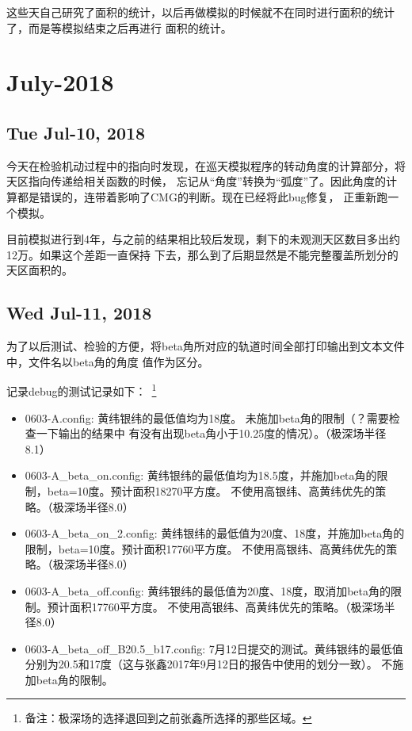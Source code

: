 这些天自己研究了面积的统计，以后再做模拟的时候就不在同时进行面积的统计了，而是等模拟结束之后再进行
面积的统计。

\section{July-2018}

\subsection{Tue Jul-10, 2018}
今天在检验机动过程中的指向时发现，在巡天模拟程序的转动角度的计算部分，将天区指向传递给相关函数的时候，
忘记从“角度”转换为“弧度”了。因此角度的计算都是错误的，连带着影响了CMG的判断。现在已经将此bug修复，
正重新跑一个模拟。

目前模拟进行到4年，与之前的结果相比较后发现，剩下的未观测天区数目多出约12万。如果这个差距一直保持
下去，那么到了后期显然是不能完整覆盖所划分的天区面积的。

\subsection{Wed Jul-11, 2018}

为了以后测试、检验的方便，将beta角所对应的轨道时间全部打印输出到文本文件中，文件名以beta角的角度
值作为区分。

记录debug的测试记录如下：~\footnote{备注：极深场的选择退回到之前张鑫所选择的那些区域。}
\begin{itemize}
\item 0603-A.config: 黄纬银纬的最低值均为18度。  未施加beta角的限制（？需要检查一下输出的结果中
有没有出现beta角小于10.25度的情况）。（极深场半径8.1）

\item 0603-A\_beta\_on.config:
黄纬银纬的最低值均为18.5度，并施加beta角的限制，beta=10度。预计面积18270平方度。
不使用高银纬、高黄纬优先的策略。（极深场半径8.0）

\item 0603-A\_beta\_on\_2.config:
黄纬银纬的最低值为20度、18度，并施加beta角的限制，beta=10度。预计面积17760平方度。
不使用高银纬、高黄纬优先的策略。（极深场半径8.0）

\item 0603-A\_beta\_off.config:
黄纬银纬的最低值为20度、18度，取消加beta角的限制。预计面积17760平方度。
不使用高银纬、高黄纬优先的策略。（极深场半径8.0）

\item 0603-A\_beta\_off\_B20.5\_b17.config:
7月12日提交的测试。黄纬银纬的最低值分别为20.5和17度（这与张鑫2017年9月12日的报告中使用的划分一致）。
不施加beta角的限制。
\end{itemize}

